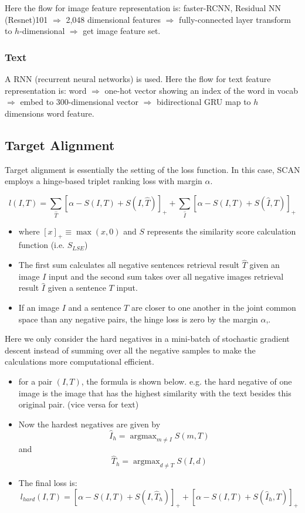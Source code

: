Here the flow for image feature representation is: faster-RCNN, Residual NN (Resnet)101 $\Rightarrow$ 2,048 dimensional features $\Rightarrow$ fully-connected layer transform to $h$-dimensional $\Rightarrow$ get image feature set.

\subsubsection{Text}A RNN (recurrent neural networks) is used. Here the flow for text feature representation is: word $\Rightarrow$ one-hot vector showing an index of the word in vocab $\Rightarrow$ embed to 300-dimensional vector $\Rightarrow$ bidirectional GRU map to $h$ dimensions word feature.

\subsection{Target Alignment}
Target alignment is essentially the setting of the loss function. In this case, SCAN employs a hinge-based triplet ranking loss with margin $\alpha$.

$$
l(I, T)=\sum_{\hat{T}}[\alpha-S(I, T)+S(I, \hat{T})]_{+}+\sum_{\hat{I}}[\alpha-S(I, T)+S(\hat{I}, T)]_{+}
$$

\begin{itemize}
    \item where $[x]_{+} \equiv \max (x, 0)$ and $S$ represents the similarity score calculation function (i.e. $S_{L S E}$)
    \item The first sum calculates all negative sentences retrieval result $\hat{T}$ given an image $I$ input and the second sum takes over all negative images retrieval result $\hat{I}$ given a sentence $T$ input.
    \item If an image $I$ and a sentence $T$ are closer to one another in the joint common space than any negative pairs, the hinge loss is zero by the margin $\alpha$,.
\end{itemize}

Here we only consider the hard negatives in a mini-batch of stochastic gradient descent instead of summing over all the negative samples to make the calculations more computational efficient.

\begin{itemize}
    \item for a pair $(I, T)$, the formula is shown below. e.g. the hard negative of one image is the image that has the highest similarity with the text besides this original pair. (vice versa for text)
    \item Now the hardest negatives are given by $$\hat{I}_{h}=\operatorname{argmax}_{m \neq I} S(m, T)$$ and $$\hat{T}_{h}=\operatorname{argmax}_{d \neq T} S(I, d)$$
    \item The final loss is: 
    $$l_{h a r d}(I, T)=\left[\alpha-S(I, T)+S\left(I, \hat{T}_{h}\right)\right]_{+}+\left[\alpha-S(I, T)+S\left(\hat{I}_{h}, T\right)\right]_{+}$$
\end{itemize}

